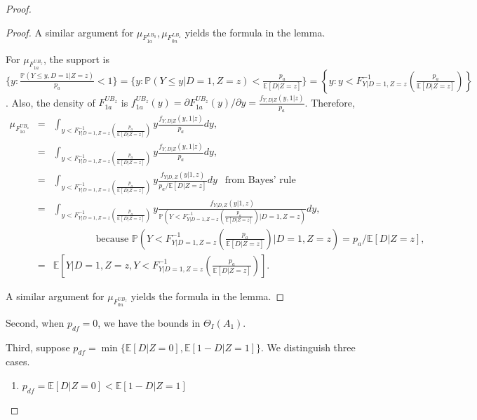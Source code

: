 \documentclass[12pt]{article}
\theoremstyle{plain}
\theoremstyle{definition}
\theoremstyle{remark}
\begin{document}
\begin{proof}
\begin{proof}
    A similar argument for $\mu_{F_{1a}^{LB_0}}, \mu_{F_{0n}^{LB_z}}$ yields the formula in the lemma.
    
    For $\mu_{F_{1a}^{UB_z}}$, the support is $\{y: \frac{\mathbb P(Y\leq y, D=1 \vert Z=z)}{p_a} < 1\}=\{y: \mathbb P(Y \leq y \vert D=1, Z=z) < \frac{p_a}{\mathbb E[D\vert Z=z]}\}=\left\{y: y< F^{-1}_{Y\vert D=1,Z=z}\left(\frac{p_a}{\mathbb E[D\vert Z=z]}\right)\right\}$. Also, the density of $F_{1a}^{UB_z}$ is $f_{1a}^{UB_z}(y)=\partial F_{1a}^{UB_z}(y)/\partial y=\frac{f_{Y,D\vert Z}(y,1\vert z)}{p_a}$. Therefore,
    \begin{eqnarray*}
       \mu_{F_{1a}^{UB_z}} &=& \int_{y< F^{-1}_{Y\vert D=1,Z=z}\left(\frac{p_a}{\mathbb E[D\vert Z=z]}\right)} y \frac{f_{Y,D\vert Z}(y,1\vert z)}{p_a} dy,\\
       &=& \int_{y< F^{-1}_{Y\vert D=1,Z=z}\left(\frac{p_a}{\mathbb E[D\vert Z=z]}\right)} y \frac{f_{Y,D\vert Z}(y,1\vert z)}{p_a} dy,\\
       &=& \int_{y< F^{-1}_{Y\vert D=1,Z=z}\left(\frac{p_a}{\mathbb E[D\vert Z=z]}\right)} y \frac{f_{Y\vert D, Z}(y\vert 1, z)}{p_a/\mathbb E[D\vert Z=z]} dy\ \ \text{ from Bayes' rule}\\
       &=& \int_{y < F^{-1}_{Y\vert D=1,Z=z}\left(\frac{p_a}{\mathbb E[D\vert Z=z]}\right)} y \frac{f_{Y\vert D, Z}(y\vert 1, z)}{\mathbb P\left(Y < F^{-1}_{Y\vert D=1,Z=z}\left(\frac{p_a}{\mathbb E[D\vert Z=z]}\right) \vert D = 1, Z = z\right)} dy,\\ 
       && \qquad \qquad \text{ because } \mathbb P\left(Y < F^{-1}_{Y\vert D=1,Z=z}\left(\frac{p_a}{\mathbb E[D\vert Z=z]}\right) \vert D = 1, Z = z\right)=p_a/\mathbb E[D\vert Z=z],\\
       &=& \mathbb E\left[Y\vert D=1, Z=z, Y < F^{-1}_{Y\vert D=1, Z=z}\left(\frac{p_a}{\mathbb E[D\vert Z=z]}\right)\right]. 
    \end{eqnarray*}

    A similar argument for $\mu_{F_{0n}^{UB_z}}$ yields the formula in the lemma.
    
\end{proof}

Second, when $p_{df}=0$, we have the bounds in $\Theta_I(A_1)$.

Third, suppose $p_{df}=\min\{\mathbb E[D\vert Z=0],\mathbb E[1-D\vert Z=1]\}$. We distinguish three cases.
\begin{enumerate}
    \item $p_{df}=\mathbb E[D\vert Z=0] < \mathbb E[1-D\vert Z=1]$


\end{enumerate}
\end{proof}
\end{document}
